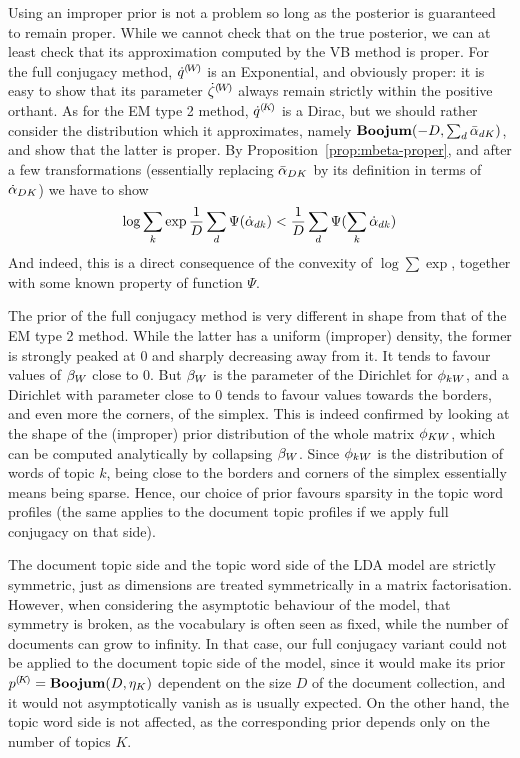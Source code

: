 Using an improper prior is not a problem so long as the posterior is guaranteed to remain proper. While we cannot check that on the true posterior, we can at least check that its approximation computed by the VB method is proper. For the full conjugacy method, ${\dot{q}}^{(\!{W}\!)}$ is an Exponential, and obviously proper: it is easy to show that its parameter ${\dot{\zeta}}^{(\!{W}\!)}$ always remain strictly within the positive orthant. As for the EM type 2 method, ${\dot{q}}^{(\!{K}\!)}$ is a Dirac, but we should rather consider the distribution which it approximates, namely $\mathbf{Boojum}(-D,\sum_d\bar{\alpha}_{dK})$, and show that the latter is proper. By Proposition~\ref{prop:mbeta-proper}, and after a few transformations (essentially replacing $\bar{\alpha}_{DK}$ by its definition in terms of $\dot{\alpha}_{DK}$) we have to show
\[
\log\sum_k\exp\frac{1}{D}\sum_d\Psi(\dot{\alpha}_{dk})<\frac{1}{D}\sum_{d}\Psi(\sum_k\dot{\alpha}_{dk})
\]
And indeed, this is a direct consequence of the convexity of $\log\sum\exp$, together with some known property of function $\Psi$.

The prior of the full conjugacy method is very different in shape from that of the EM type 2 method. While the latter has a uniform (improper) density, the former is strongly peaked at $0$ and sharply decreasing away from it. It tends to favour values of $\beta_W$ close to $0$. But $\beta_W$ is the parameter of the Dirichlet for $\phi_{kW}$, and a Dirichlet with parameter close to 0 tends to favour values towards the borders, and even more the corners, of the simplex. This is indeed confirmed by looking at the shape of the (improper) prior distribution of the whole matrix $\phi_{KW}$, which can be computed analytically by collapsing $\beta_W$. Since $\phi_{kW}$ is the distribution of words of topic $k$, being close to the borders and corners of the simplex essentially means being sparse. Hence, our choice of prior favours sparsity in the topic word profiles (the same applies to the document topic profiles if we apply full conjugacy on that side).

The document topic side and the topic word side of the LDA model are strictly symmetric, just as dimensions are treated symmetrically in a matrix factorisation. However, when considering the asymptotic behaviour of the model, that symmetry is broken, as the vocabulary is often seen as fixed, while the number of documents can grow to infinity. In that case, our full conjugacy variant could not be applied to the document topic side of the model, since it would make its prior ${p}^{(\!{K}\!)}=\mathbf{Boojum}(D,\eta_K)$ dependent on the size $D$ of the document collection, and it would not asymptotically vanish as is usually expected. On the other hand, the topic word side is not affected, as the corresponding prior depends only on the number of topics $K$.